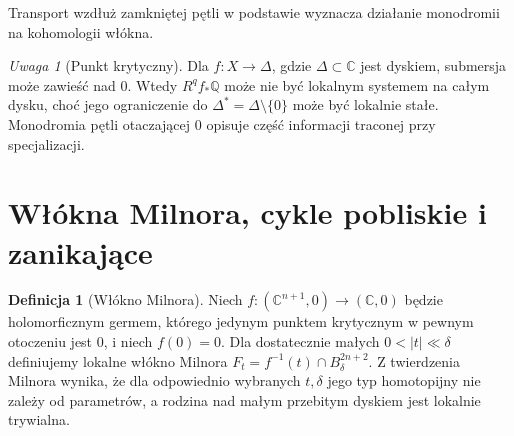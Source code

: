 \documentclass[11pt,a4paper,oneside]{report}
\newcommand{\C}{\mathbb{C}}
\newcommand{\Q}{\mathbb{Q}}
\theoremstyle{plain}
\theoremstyle{definition}
\newtheorem{definicja}[twierdzenie]{Definicja}
\theoremstyle{remark}
\newtheorem{uwaga}[twierdzenie]{Uwaga}
\begin{document}
\begin{center}
\par\medskip\small Transport wzdłuż zamkniętej pętli w podstawie
wyznacza działanie monodromii na kohomologii włókna.
\end{center}

\begin{uwaga}[Punkt krytyczny]
Dla $f:X\to\Delta$, gdzie $\Delta\subset\C$ jest dyskiem,
submersja może zawieść nad $0$. Wtedy
$R^qf_*\Q$ może nie być lokalnym systemem na całym dysku,
choć jego ograniczenie do $\Delta^*=\Delta\setminus\{0\}$
może być lokalnie stałe. Monodromia pętli otaczającej
$0$ opisuje część informacji traconej przy specjalizacji.
\end{uwaga}

\section{Włókna Milnora, cykle pobliskie i zanikające}
\begin{definicja}[Włókno Milnora]
Niech $f:(\C^{n+1},0)\to(\C,0)$ będzie holomorficznym
germem, którego jedynym punktem krytycznym w
pewnym otoczeniu jest $0$, i niech $f(0)=0$.
Dla dostatecznie małych $0<|t|\ll\delta$ definiujemy
lokalne włókno Milnora
$F_t=f^{-1}(t)\cap B_\delta^{2n+2}$.
Z twierdzenia Milnora wynika, że dla odpowiednio
wybranych $t,\delta$ jego typ homotopijny nie
zależy od parametrów, a rodzina nad małym
przebitym dyskiem jest lokalnie trywialna.
\end{definicja}
\end{document}
